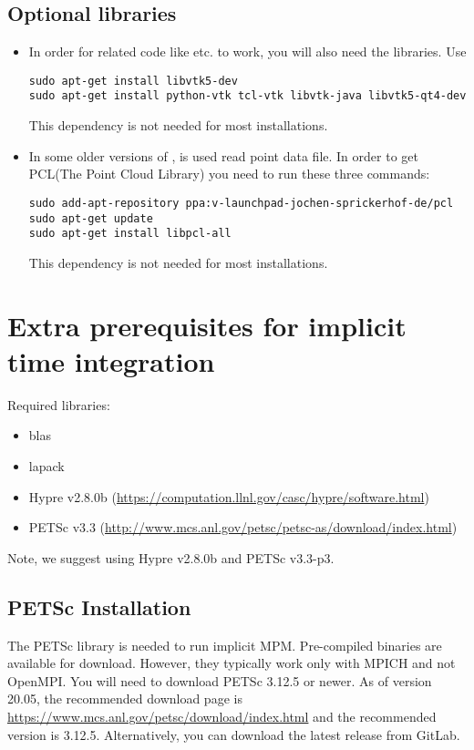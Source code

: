 \documentclass[11pt,fleqn]{book} %
\begin{document}
\subsection{Optional libraries}
\begin{itemize}
  \item In order for related code like  etc. to work, you will also need the 
         libraries. Use
\begin{lstlisting}[backgroundcolor=\color{background}]
sudo apt-get install libvtk5-dev
sudo apt-get install python-vtk tcl-vtk libvtk-java libvtk5-qt4-dev
\end{lstlisting}
        \begin{NoteBox}
        This dependency is not needed for most installations.
        \end{NoteBox}

  \item In some older versions of \Vaango,  is used read point data file. In order 
        to get PCL(The Point Cloud Library) you need to run these three commands:
\begin{lstlisting}[backgroundcolor=\color{background}]
sudo add-apt-repository ppa:v-launchpad-jochen-sprickerhof-de/pcl
sudo apt-get update
sudo apt-get install libpcl-all
\end{lstlisting}
        \begin{NoteBox}
        This dependency is not needed for most installations.
        \end{NoteBox}
\end{itemize}

\section{Extra prerequisites for implicit  time integration}
Required libraries:
\begin{itemize}
\item blas
\item lapack
\item Hypre v2.8.0b (\url{https://computation.llnl.gov/casc/hypre/software.html})
\item PETSc v3.3 (\url{http://www.mcs.anl.gov/petsc/petsc-as/download/index.html})
\end{itemize}
Note, we suggest using Hypre v2.8.0b and PETSc v3.3-p3. 

\subsection{PETSc Installation}
The PETSc library is needed to run implicit MPM.  Pre-compiled binaries 
are available for download.  However, they typically work only with MPICH and not
OpenMPI.  You will need to download PETSc 3.12.5 or newer.  As of version 20.05,
the recommended download page is
\url{https://www.mcs.anl.gov/petsc/download/index.html}
and the recommended version is 3.12.5.
Alternatively, you can download the latest release from GitLab.
\end{document}
